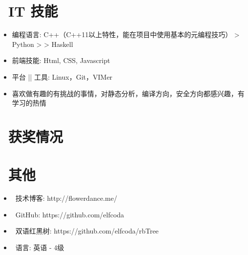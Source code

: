 \documentclass{resume}
\begin{document}

\section{\faCogs\ IT 技能}
\begin{itemize}[parsep=0.5ex]
  \item 编程语言: C++（C++11以上特性，能在项目中使用基本的元编程技巧）  >  Python  > >  Haskell
  \item 前端技能: Html, CSS, Javascript
  \item 平台 || 工具: Linux，Git，VIMer
  \item 喜欢做有趣的有挑战的事情，对静态分析，编译方向，安全方向都感兴趣，有学习的热情
\end{itemize}

\section{\faHeartO\ 获奖情况}
\datedline{\textit{}}{}

\section{\faInfo\ 其他}
\begin{itemize}[parsep=0.5ex]
  \item \faHome\ 技术博客: http://flowerdance.me/
  \item \faGithubAlt\ GitHub: https://github.com/elfcoda
  \item \faGithubAlt\ 双语红黑树: https://github.com/elfcoda/rbTree
  \item \faLanguage\ 语言: 英语 - 4级
\end{itemize}

%
%
\end{document}
